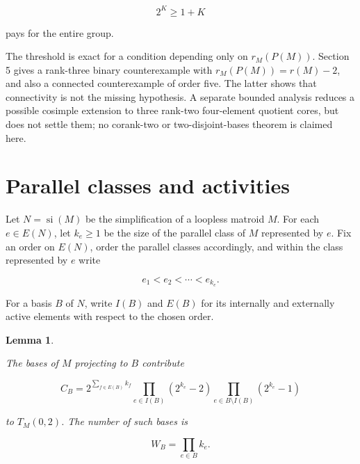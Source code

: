 \documentclass[11pt]{article}
\newtheorem{lemma}[theorem]{Lemma}
\begin{document}
\[
2^K\ge 1+K
\]

pays for the entire group.

The threshold is exact for a condition depending only on
\(r_M(P(M))\). Section 5 gives a rank-three binary counterexample with
\(r_M(P(M))=r(M)-2\), and also a connected counterexample of order five.
The latter shows that connectivity is not the missing hypothesis. A separate
bounded analysis reduces a possible cosimple extension to three rank-two
four-element quotient cores, but does not settle them; no corank-two or
two-disjoint-bases theorem is claimed here.

\section{Parallel classes and activities}


Let \(N=\operatorname{si}(M)\) be the simplification of a loopless matroid
\(M\). For each \(e\in E(N)\), let \(k_e\ge1\) be the size of the parallel
class of \(M\) represented by \(e\). Fix an order on \(E(N)\), order the
parallel classes accordingly, and within the class represented by \(e\) write

\[
e_1<e_2<\cdots<e_{k_e}.
\]

For a basis \(B\) of \(N\), write \(I(B)\) and \(E(B)\) for its internally
and externally active elements with respect to the chosen order.

\Needspace{0.18\textheight}
\begin{lemma}
\label{lem:activity-block}

The bases of \(M\) projecting to \(B\) contribute

\[
C_B=
2^{\sum_{f\in E(B)}k_f}
\prod_{e\in I(B)}(2^{k_e}-2)
\prod_{e\in B\setminus I(B)}(2^{k_e}-1)        \tag{2.1}
\]

to \(T_M(0,2)\). The number of such bases is

\[
W_B=\prod_{e\in B}k_e.                         \tag{2.2}
\]

\end{lemma}
\end{document}
